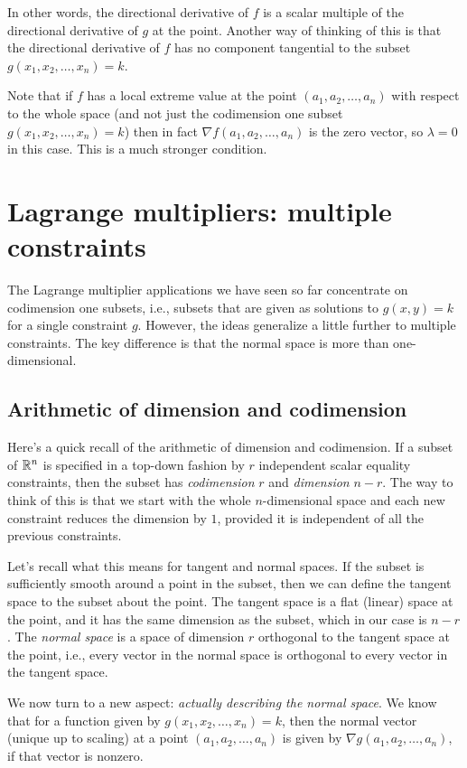 \documentclass[10pt]{amsart}
\begin{document}
In other words, the directional derivative of $f$ is a scalar multiple
of the directional derivative of $g$ at the point. Another way of
thinking of this is that the directional derivative of $f$ has no
component tangential to the subset $g(x_1,x_2,\dots,x_n) = k$.

Note that if $f$ has a local extreme value at the point
$(a_1,a_2,\dots,a_n)$ with respect to the whole space (and not just
the codimension one subset $g(x_1,x_2,\dots,x_n) = k$) then in fact
$\nabla f(a_1,a_2,\dots,a_n)$ is the zero vector, so $\lambda = 0$ in
this case. This is a much stronger condition.

\section{Lagrange multipliers: multiple constraints}

The Lagrange multiplier applications we have seen so far concentrate
on codimension one subsets, i.e., subsets that are given as solutions
to $g(x,y) = k$ for a single constraint $g$. However, the ideas
generalize a little further to multiple constraints. The key
difference is that the normal space is more than one-dimensional.

\subsection{Arithmetic of dimension and codimension}

Here's a quick recall of the arithmetic of dimension and
codimension. If a subset of $\mathbb{R}^n$ is specified in a top-down fashion
by $r$ independent scalar equality constraints, then the subset has
{\em codimension} $r$ and {\em dimension} $n - r$. The way to think of
this is that we start with the whole $n$-dimensional space and each
new constraint reduces the dimension by $1$, provided it is
independent of all the previous constraints.

Let's recall what this means for tangent and normal spaces. If the
subset is sufficiently smooth around a point in the subset, then we
can define the tangent space to the subset about the point. The
tangent space is a flat (linear) space at the point, and it has the
same dimension as the subset, which in our case is $n - r$. The {\em
normal space} is a space of dimension $r$ orthogonal to the tangent
space at the point, i.e., every vector in the normal space is
orthogonal to every vector in the tangent space.

We now turn to a new aspect: {\em actually describing the normal
space}. We know that for a function given by $g(x_1,x_2,\dots,x_n) =
k$, then the normal vector (unique up to scaling) at a point
$(a_1,a_2,\dots,a_n)$ is given by $\nabla g(a_1,a_2,\dots,a_n)$, if
that vector is nonzero.
\end{document}
